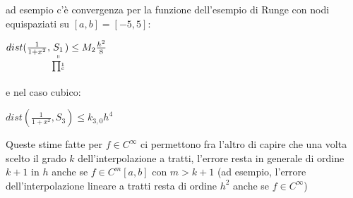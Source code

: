 \documentclass[12pt,a4paper]{article}
\newcommand{\inter}{\begin{matrix}\prod\end{matrix}}
\begin{document}
ad esempio c'è convergenza per la funzione dell'esempio di Runge con nodi equispaziati su $[a,b]=[-5,5]$:\\
\begin{center}
    $dist(\frac{1}{1+x^2}, \underset{\underset{\inter^1_c}{\shortparallel}}{S_1}) \leq M_2 \frac{h^2}{8}$
\end{center}
e nel caso cubico: 
\begin{center}
$dist(\frac{1}{1+x^2},S_3)\leq k_{3,0} h^4$\\
\end{center}
Queste stime fatte per $f \in C^\infty$ ci permettono fra l'altro di capire che una volta scelto il grado $k$ dell'interpolazione a tratti, l'errore resta in generale di ordine $k+1$ in $h$ anche se $f \in C^m [a,b]$ con $m > k+1$ (ad esempio, l'errore dell'interpolazione lineare a tratti resta di ordine $h^2$ anche se $f \in C^\infty$)
\end{document}
